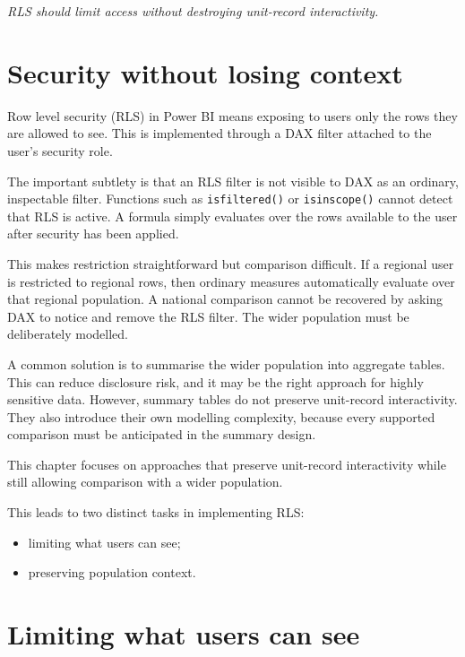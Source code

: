 \documentclass[10pt,openany,10pt]{book}
\providecommand{\tightlist}{%
  \setlength{\itemsep}{0pt}\setlength{\parskip}{0pt}}
\begin{document}
\emph{RLS should limit access without destroying unit-record
interactivity.}

\section{Security without losing
context}\label{security-without-losing-context}

Row level security (RLS) in Power BI means exposing to users only the
rows they are allowed to see. This is implemented through a DAX filter
attached to the user's security role.

The important subtlety is that an RLS filter is not visible to DAX as an
ordinary, inspectable filter. Functions such as \texttt{isfiltered()} or
\texttt{isinscope()} cannot detect that RLS is active. A formula simply
evaluates over the rows available to the user after security has been
applied.

This makes restriction straightforward but comparison difficult. If a
regional user is restricted to regional rows, then ordinary measures
automatically evaluate over that regional population. A national
comparison cannot be recovered by asking DAX to notice and remove the
RLS filter. The wider population must be deliberately modelled.

A common solution is to summarise the wider population into aggregate
tables. This can reduce disclosure risk, and it may be the right
approach for highly sensitive data. However, summary tables do not
preserve unit-record interactivity. They also introduce their own
modelling complexity, because every supported comparison must be
anticipated in the summary design.

This chapter focuses on approaches that preserve unit-record
interactivity while still allowing comparison with a wider population.

This leads to two distinct tasks in implementing RLS:

\begin{itemize}
\tightlist
\item
  limiting what users can see;
\item
  preserving population context.
\end{itemize}

\section{Limiting what users can see}\label{limiting-what-users-can-see}
\end{document}
